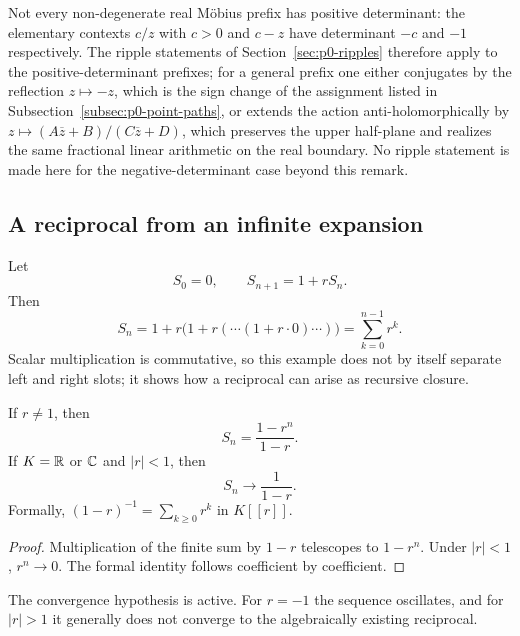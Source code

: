 \begin{warning}
\label{warn:p0-negative-determinant}
Not every non-degenerate real Möbius prefix has positive determinant: the
elementary contexts $c/z$ with $c>0$ and $c-z$ have determinant $-c$ and $-1$
respectively.  The ripple statements of Section~\ref{sec:p0-ripples} therefore
apply to the positive-determinant prefixes; for a general prefix one either
conjugates by the reflection $z\mapsto-z$, which is the sign change of the
assignment listed in Subsection~\ref{subsec:p0-point-paths}, or extends the
action anti-holomorphically by $z\mapsto (A\overline z+B)/(C\overline z+D)$,
which preserves the upper half-plane and realizes the same fractional linear
arithmetic on the real boundary.  No ripple statement is made here for the
negative-determinant case beyond this remark.
\end{warning}

\subsection{A reciprocal from an infinite expansion}

Let
\begin{equation}\label{eq:p0-geometric-recursion}
  S_0=0,
  \qquad
  S_{n+1}=1+rS_n.
\end{equation}
Then
\[
  S_n=1+r\bigl(1+r(\cdots(1+r\cdot0)\cdots)\bigr)
      =\sum_{k=0}^{n-1}r^k.
\]
Scalar multiplication is commutative, so this example does not by itself
separate left and right slots; it shows how a reciprocal can arise as recursive
closure.

\begin{proposition}
\label{prop:p0-finite-geometric-expansion}
If $r\ne1$, then
\begin{equation}\label{eq:p0-finite-geometric-quotient}
  S_n=\frac{1-r^n}{1-r}.
\end{equation}
If $K=\mathbb{R}$ or $\mathbb{C}$ and $|r|<1$, then
\[
  S_n\longrightarrow\frac1{1-r}.
\]
Formally, $(1-r)^{-1}=\sum_{k\ge0}r^k$ in $K[[r]]$.
\end{proposition}

\begin{proof}
Multiplication of the finite sum by $1-r$ telescopes to $1-r^n$.
Under $|r|<1$, $r^n\to0$.  The formal identity follows coefficient by
coefficient.
\end{proof}

The convergence hypothesis is active.  For $r=-1$ the sequence oscillates,
and for $|r|>1$ it generally does not converge to the algebraically existing
reciprocal.

